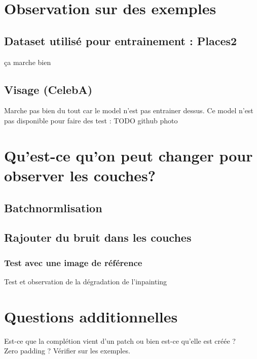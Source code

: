 \documentclass[12pt]{article}
\begin{document}
\section{Observation sur des exemples}

\subsection{Dataset utilisé pour entrainement : Places2}
ça marche bien

\subsection{Visage (CelebA)}
Marche pas bien du tout car le model n'est pas entrainer dessus.
Ce model n'est pas disponible pour faire des test : TODO github photo

\section{Qu'est-ce qu'on peut changer pour observer les couches?}

\subsection{Batchnormlisation}


\subsection{Rajouter du bruit dans les couches}

\subsubsection{Test avec une image de référence}
Test et observation de la dégradation de l'inpainting

\section{Questions additionnelles}

Est-ce que la complétion vient d'un patch ou bien est-ce qu'elle est créée ? \\
Zero padding ? Vérifier sur les exemples.\\



\end{document}
